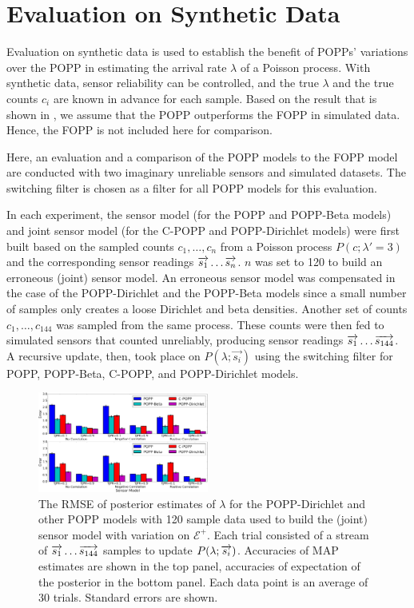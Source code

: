 \section{Evaluation on Synthetic Data}
\label{sec:evasim}

Evaluation on synthetic data is used to establish the benefit of POPPs' variations over the POPP in estimating the arrival rate $\lambda$ of a Poisson process. With synthetic data, sensor reliability can be controlled, and the true $\lambda$ and the true counts $c_i$ are known in advance for each sample. Based on the result that is shown in \cite{jovan18a}, we assume that the POPP outperforms the FOPP in simulated data. Hence, the FOPP is not included here for comparison.

Here, an evaluation and a comparison of the POPP models to the FOPP model are conducted with two imaginary unreliable sensors and simulated datasets. The switching filter is chosen as a filter for all POPP models for this evaluation. 

In each experiment, the sensor model (for the POPP and POPP-Beta models) and joint sensor model (for the C-POPP and POPP-Dirichlet models) were first built based on the sampled counts $c_1, \ldots, c_n$ from a Poisson process $P(c ; \lambda'=3)$ and the corresponding sensor readings $\protect\overrightarrow{s_1} \ldots \protect\overrightarrow{s_{n}}$. $n$ was set to 120 to build an erroneous (joint) sensor model. An erroneous sensor model was compensated in the case of the POPP-Dirichlet and the POPP-Beta models since a small number of samples only creates a loose Dirichlet and beta densities. Another set of counts $c_1, \ldots, c_{144}$ was sampled from the same process. These counts were then fed to simulated sensors that counted unreliably, producing sensor readings $\protect\overrightarrow{s_1} \ldots \protect\overrightarrow{s_{144}}$. A recursive update, then, took place on $P(\lambda ; \overrightarrow{s_i})$ using the switching filter for POPP, POPP-Beta, C-POPP, and POPP-Dirichlet models.

\begin{figure}[t!]
	\centering
	\includegraphics[width=0.5\textwidth]{./figures/tjpr_comparison_120.png}
    \caption{The RMSE of posterior estimates of $\lambda$ for the POPP-Dirichlet and other POPP models with 120 sample data used to build the (joint) sensor model with variation on $\mathcal{E^+}$. Each trial consisted of a stream of $\protect\overrightarrow{s_1} \ldots \protect\overrightarrow{s_{144}}$ samples to update $P(\lambda ; \protect\overrightarrow{s_i})$. Accuracies of MAP estimates are shown in the top panel, accuracies of expectation of the posterior in the bottom panel. Each data point is an average of 30 trials. Standard errors are shown.} 
	\label{fig:tjpr_comparison_120}
\end{figure}

